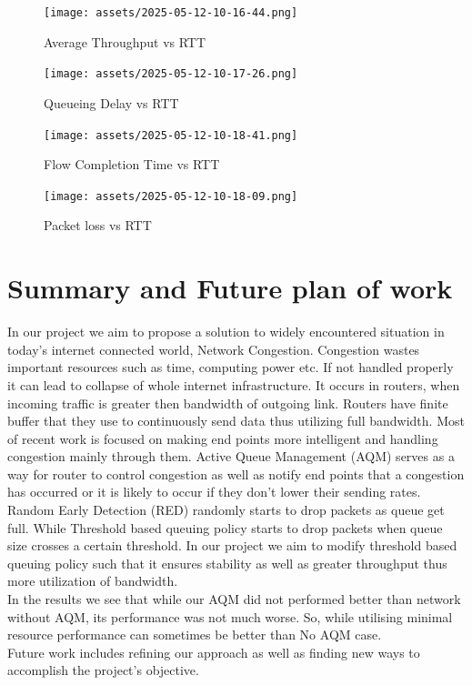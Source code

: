 \begin{figure}[h]
  \centering
  \texttt{[image: assets/2025-05-12-10-16-44.png]}
  \caption{Average Throughput vs RTT}
  \label{fig:myfig9}
\end{figure}

\begin{figure}[h]
  \centering
  \texttt{[image: assets/2025-05-12-10-17-26.png]}
  \caption{Queueing Delay vs RTT}
  \label{fig:myfig10}
\end{figure}
 
\begin{figure}[h]
  \centering
  \texttt{[image: assets/2025-05-12-10-18-41.png]}
  \caption{Flow Completion Time vs RTT}
  \label{fig:myfig11}
\end{figure}

\begin{figure}[h]
  \centering
  \texttt{[image: assets/2025-05-12-10-18-09.png]}
  \caption{Packet loss vs RTT}
  \label{fig:myfig12}
\end{figure}


\clearpage
\section{Summary and Future plan of work}
In our project we aim to propose a solution to widely encountered situation in today's internet connected world, Network Congestion. Congestion wastes important resources such as time, computing power etc. If not handled properly it can lead to collapse of whole internet infrastructure. It occurs in routers, when incoming traffic is greater then bandwidth of outgoing link. Routers have finite buffer that they use to continuously send data thus utilizing full bandwidth. Most of recent work is focused on making end points more intelligent and handling congestion mainly through them. Active Queue Management (AQM) serves as a way for router to control congestion as well as notify end points that a congestion has occurred or it is likely to occur if they don't lower their sending rates. Random Early Detection (RED) randomly starts to drop packets as queue get full. While Threshold based queuing policy starts to drop packets when queue size crosses a certain threshold. In our project we aim to modify threshold based queuing policy such that it ensures stability as well as greater throughput thus more utilization of bandwidth.\\
In the results we see that while our AQM did not performed better than network without AQM, its performance was not much worse. So, while utilising minimal resource performance can sometimes be better than No AQM case. \\ 
Future work includes refining our approach as well as finding new ways to accomplish the project's objective. \\

\clearpage



